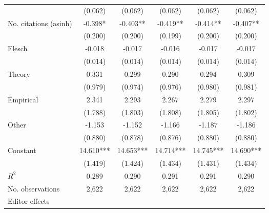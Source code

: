 \begin{table}[H]
\begin{threeparttable}
\begin{tabular}{p{4cm}SSSSS}
                                          &     (0.062)   &     (0.062)   &     (0.062)   &     (0.062)   &     (0.062)   \\
            No. citations (asinh)         &      -0.398*  &      -0.403** &      -0.419** &      -0.414** &      -0.407** \\
                                          &     (0.200)   &     (0.200)   &     (0.199)   &     (0.200)   &     (0.200)   \\
            Flesch                        &      -0.018   &      -0.017   &      -0.016   &      -0.017   &      -0.017   \\
                                          &     (0.014)   &     (0.014)   &     (0.014)   &     (0.014)   &     (0.014)   \\
            Theory                        &       0.331   &       0.299   &       0.290   &       0.294   &       0.309   \\
                                          &     (0.979)   &     (0.974)   &     (0.976)   &     (0.980)   &     (0.981)   \\
            Empirical                     &       2.341   &       2.293   &       2.267   &       2.279   &       2.297   \\
                                          &     (1.788)   &     (1.803)   &     (1.808)   &     (1.805)   &     (1.802)   \\
            Other                         &      -1.153   &      -1.152   &      -1.166   &      -1.187   &      -1.186   \\
                                          &     (0.880)   &     (0.878)   &     (0.876)   &     (0.880)   &     (0.880)   \\
            Constant                      &      14.610***&      14.653***&      14.714***&      14.745***&      14.690***\\
                                          &     (1.419)   &     (1.424)   &     (1.434)   &     (1.431)   &     (1.434)   \\
            \midrule
            \(R^2\)                       &       0.289   &       0.290   &       0.291   &       0.291   &       0.290   \\
            No. observations              &       2,622   &       2,622   &       2,622   &       2,622   &       2,622   \\
            \midrule
            Editor effects       &           {}   &           {}   &           {}   &           {}   &           {}   \\

\end{tabular}
\end{threeparttable}
\end{table}
